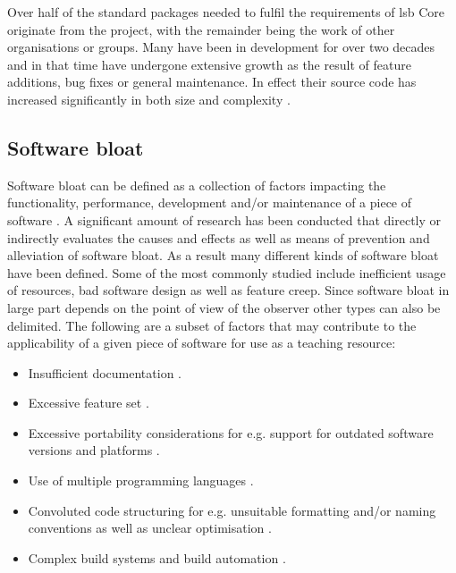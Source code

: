 Over half of the standard packages needed to fulfil the requirements of \gls{lsb} Core originate from the  project, with the remainder being the work of other organisations or groups. Many have been in development for over two decades and in that time have undergone extensive growth as the result of feature additions, bug fixes or general maintenance. In effect their source code has increased significantly in both size and complexity \cite{Succi2001PreliminaryRF,Quach2018DebloatingST,Quach2019BloatFA}.

\subsection{Software bloat}

Software bloat can be defined as a collection of factors impacting the functionality, performance, development and/or maintenance of a piece of software \cite{McGrenere2000AreWA,McGrenere2000BloatTO,Quach2018DebloatingST,Quach2019BloatFA}. A significant amount of research has been conducted that directly or indirectly evaluates the causes \cite{Mitchell2010FourTL} and effects \cite{Quach2019BloatFA} as well as means of prevention \cite{Pike2007ProgramDI,Milicchio2007TheUK} and alleviation \cite{Quach2018DebloatingST} of software bloat. As a result many different kinds of software bloat have been defined. Some of the most commonly studied include inefficient usage of resources, bad software design as well as feature creep. Since software bloat in large part depends on the point of view of the observer other types can also be delimited. The following are a subset of factors that may contribute to the applicability of a given piece of software for use as a teaching resource:

\begin{itemize}
    \item Insufficient documentation \cite{doc-issues,doc-quality}.
    \item Excessive feature set \cite{lean-plea,lean-software,reduction}.
    \item Excessive portability considerations for e.g. support for outdated software versions and platforms \cite{autohell,four-lang}.
    \item Use of multiple programming languages \cite{multi-lang}.
    \item Convoluted code structuring for e.g. unsuitable formatting and/or naming conventions as well as unclear optimisation \cite{convention-violations,variable-naming}.
    \item Complex build systems and build automation \cite{recursive,non-recursive,tool-usage}.
\end{itemize}

